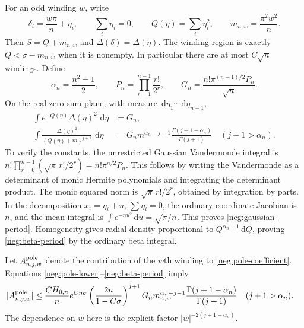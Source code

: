 \documentclass[11pt]{article}
\numberwithin{equation}{section}
\theoremstyle{definition}
\newcommand{\dd}{\,\mathrm d}
\begin{document}
For an odd winding \(w\), write
\begin{equation}
 \delta_i=\frac{w\pi}{n}+\eta_i,\qquad
 \sum_i\eta_i=0,\qquad
 Q(\eta)=\sum_i\eta_i^2,\qquad
 m_{n,w}=\frac{\pi^2w^2}{n}.
 \label{neg:winding}
\end{equation}
Then \(S=Q+m_{n,w}\) and \(\Delta(\delta)=\Delta(\eta)\).
The winding region is exactly \(Q<\sigma-m_{n,w}\) when it is
nonempty.  In particular there are at most \(C\sqrt n\) windings.
Define
\begin{equation}
 \alpha_n=\frac{n^2-1}{2},\qquad
 P_n=\prod_{r=1}^{n-1}\frac{r!}{2^r},\qquad
 G_n=\frac{n!\pi^{(n-1)/2}P_n}{\sqrt n}.
 \label{neg:gaussian-constant}
\end{equation}
On the real zero-sum plane, with measure
\(\dd\eta_1\cdots\dd\eta_{n-1}\),
\begin{align}
 \int e^{-Q(\eta)}\Delta(\eta)^2\,\dd\eta&=G_n,
 \label{neg:gaussian-period}\\
 \int\frac{\Delta(\eta)^2}{(Q(\eta)+m)^{j+1}}\,\dd\eta
 &=G_n m^{\alpha_n-j-1}
       \frac{\Gamma(j+1-\alpha_n)}{\Gamma(j+1)}
       \quad(j+1>\alpha_n).
 \label{neg:beta-period}
\end{align}
To verify the constants, the unrestricted Gaussian Vandermonde
integral is
\(n!\prod_{r=0}^{n-1}(\sqrt\pi\,r!/2^r)
 =n!\pi^{n/2}P_n\).
This follows by writing the Vandermonde as a determinant of monic
Hermite polynomials and integrating the determinant product.
The monic squared norm is \(\sqrt\pi\,r!/2^r\), obtained by
integration by parts.  In the decomposition
\(x_i=\eta_i+u\), \(\sum\eta_i=0\), the ordinary-coordinate
Jacobian is \(n\), and the mean integral is
\(\int e^{-nu^2}\dd u=\sqrt{\pi/n}\).  This proves
\eqref{neg:gaussian-period}.  Homogeneity gives radial density
proportional to \(Q^{\alpha_n-1}\dd Q\), proving
\eqref{neg:beta-period} by the ordinary beta integral.

Let \(A^{\rm pole}_{n,j,w}\) denote the contribution of the \(w\)th
winding to \eqref{neg:pole-coefficient}.  Equations
\eqref{neg:pole-lower}--\eqref{neg:beta-period} imply
\begin{align}
 |A^{\rm pole}_{n,j,w}|
 &\le \frac{CH_{0,n}}n e^{Cn\sigma}
    \left(\frac{2n}{1-C\sigma}\right)^{j+1}
    G_n m_{n,w}^{\alpha_n-j-1}
    \frac{\Gamma(j+1-\alpha_n)}{\Gamma(j+1)}
 \quad(j+1>\alpha_n).
 \label{neg:winding-bound}
\end{align}
The dependence on \(w\) here is the explicit factor
\(|w|^{-2(j+1-\alpha_n)}\).
\end{document}
